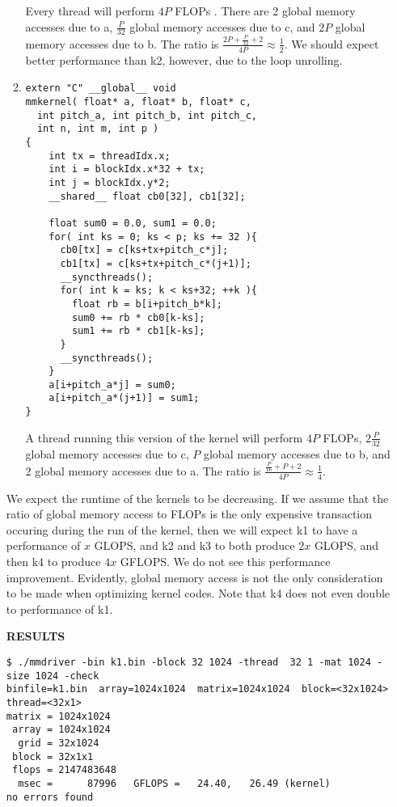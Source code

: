 \documentclass[11pt]{article}
\begin{document}
\begin{enumerate}
\begin{enumerate}
Every thread will perform $4P$ FLOPs . There are 2 global memory accesses due to a, $\frac{P}{32}$ global memory accesses due to c, and $2P$ global memory accesses due to b. The ratio is $\frac{2P + \frac{P}{32} + 2}{4P} \approx \frac12$. We should expect better performance than k2, however, due to the loop unrolling.

\item
\begin{lstlisting}
extern "C" __global__ void
mmkernel( float* a, float* b, float* c,
  int pitch_a, int pitch_b, int pitch_c,
  int n, int m, int p )
{
    int tx = threadIdx.x;
    int i = blockIdx.x*32 + tx;
    int j = blockIdx.y*2;
    __shared__ float cb0[32], cb1[32];

    float sum0 = 0.0, sum1 = 0.0;
    for( int ks = 0; ks < p; ks += 32 ){
      cb0[tx] = c[ks+tx+pitch_c*j];
      cb1[tx] = c[ks+tx+pitch_c*(j+1)];
      __syncthreads();
      for( int k = ks; k < ks+32; ++k ){
        float rb = b[i+pitch_b*k];
        sum0 += rb * cb0[k-ks];
        sum1 += rb * cb1[k-ks];
      }
      __syncthreads();
    }
    a[i+pitch_a*j] = sum0;
    a[i+pitch_a*(j+1)] = sum1;
}
\end{lstlisting}				

A thread running this version of the kernel will perform $4P$ FLOPs, $2\frac{P}{32}$ global memory accesses due to c, $P$ global memory accesses due to b, and 2 global memory accesses due to a. The ratio is $\frac{\frac{P}{16} + P + 2}{4P}\approx\frac14$. 
\end{enumerate}

We expect the runtime of the kernels to be decreasing. If we assume that the ratio of global memory access to FLOPs is the only expensive transaction occuring during the run of the kernel, then we will expect k1 to have a performance of $x$ GLOPS, and k2 and k3 to both produce $2x$ GLOPS, and then k4 to produce $4x$ GFLOPS. We do not see this performance improvement. Evidently, global memory access is not the only consideration to be made when optimizing kernel codes. Note that k4 does not even double to performance of k1.

\textbf{RESULTS}
\begin{lstlisting}
$ ./mmdriver -bin k1.bin -block 32 1024 -thread  32 1 -mat 1024 -size 1024 -check
binfile=k1.bin  array=1024x1024  matrix=1024x1024  block=<32x1024>  thread=<32x1>
matrix = 1024x1024
 array = 1024x1024
  grid = 32x1024
 block = 32x1x1
 flops = 2147483648
  msec =      87996   GFLOPS =   24.40,   26.49 (kernel)
no errors found


\end{lstlisting}
\end{enumerate}
\end{document}
